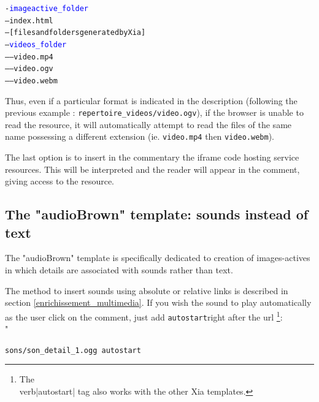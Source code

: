\begin{tikzpicture}
\end{tikzpicture}
\parbox{0.40\textwidth}
{
\begin{alltt}
 -\textcolor{blue}{imageactive\_folder}\\
 ---index.html\\
 ---[files and folders generated by Xia]\\
 ---\textcolor{blue}{videos\_folder}\\
 -----video.mp4\\
 -----video.ogv\\
 -----video.webm\\
\end{alltt}
}


Thus, even if a particular format is indicated in the description (following 
the previous example : \verb|repertoire_videos/video.ogv|), if the browser is 
unable to read the resource, it will automatically attempt to read the files 
of the same name possessing a different extension (ie. \verb|video.mp4| 
then \verb|video.webm|).

The last option is to insert in the commentary the iframe code hosting service 
resources. This will be interpreted and the reader will appear in the comment, 
giving access to the resource.

\subsection{The "audioBrown" template: sounds instead of text}

The "audioBrown" template is specifically dedicated to creation of 
images-actives in which details are associated with sounds rather than text.

The method to insert sounds using absolute or relative links is described in 
section \ref{enrichissement_multimedia}. If you wish the sound to play 
automatically as the user click on the comment, just add \verb|autostart|right 
after the url \footnote{The \\verb|autostart| tag also works with the other 
Xia templates.}:\\"
\begin{center}
 \verb|sons/son_detail_1.ogg autostart|
\end{center}


